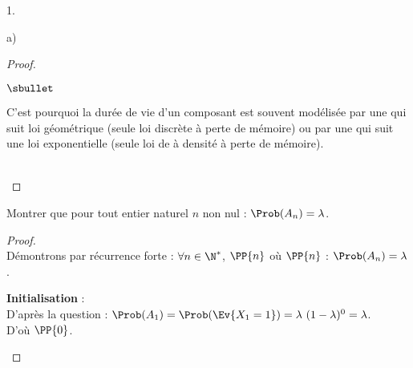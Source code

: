 \documentclass[11pt]{article}%
\begin{document}
\begin{noliste}{1.}
\begin{noliste}{a)}
\begin{proof}
\begin{remark}
\begin{noliste}{$\sbullet$}
        \item C'est pourquoi la durée de vie d'un composant est
          souvent modélisée par une \var qui suit loi géométrique
          (seule loi discrète à perte de mémoire) ou par une \var qui
          suit une loi exponentielle (seule loi de \var à densité à
          perte de mémoire). 
        \end{noliste}
      \end{remark}~\\[-1.4cm]
    \end{proof}

  \item Montrer que pour tout entier naturel $n$ non nul : $\Prob(A_n)
    = \lambda$.

    \begin{proof}~\\%
      Démontrons par récurrence forte : $\forall n \in \N^*$,
      $\PP{n}$ \quad où \quad $\PP{n}$ : $\Prob(A_n) = \lambda$.
      \begin{noliste}{\fitem}
      \item {\bf Initialisation} :\\
        D'après la question  : $\Prob(A_1) = \Prob(\Ev{ X_1
        = 1}) = \lambda \ (1 - \lambda)^0 = \lambda$.\\
      D'où $\PP{0}$.


\end{noliste}
\end{proof}
\end{noliste}
\end{noliste}
\end{document}
